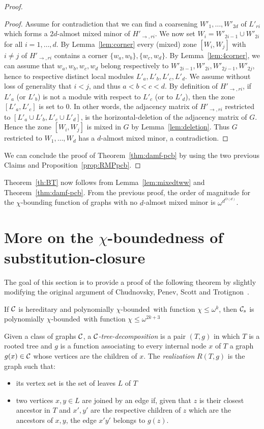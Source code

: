 \documentclass[11pt]{article}
\numberwithin{equation}{section}
\newcommand{\pcb}{polynomially $\chi$-bounded}
\begin{document}
\begin{proof}
\begin{proof}
    Assume for contradiction that we can find a coarsening $W'_1,\dots ,W'_{2d}$ of $L'_{ri}$ which forms a $2d$-almost mixed minor of $H'_{\rightarrow,ri}$. We now set $W_i=W'_{2i-1}\cup W'_{2i}$ for all $i=1,\dots ,d$. 
    By Lemma~\ref{lem:corner} every (mixed) zone $[W_i,W_j]$ with $i\neq j$ of $H'_{\rightarrow,ri}$ contains a corner $\{w_a,w_b\},\{w_c,w_d\}$.  By Lemma~\ref{lem:4corner}, we can assume that $w_a,w_b,w_c,w_d$ belong respectively to $W'_{2i-1},W'_{2i},W'_{2j-1},W'_{2j}$, hence to respective distinct local modules $L'_a,L'_b,L'_c,L'_d$.
    We assume without loss of generality that $i<j$, and thus $a<b<c<d$. 
    By definition of $H'_{\rightarrow,ri}$, if $L'_a$ (or $L'_b$) is not a module with respect to $L'_c$ (or to $L'_d$), then the zone $[L'_a,L'_c]$ is set to 0. In other words, the adjacency matrix of $H'_{\rightarrow,ri}$ restricted to $[L'_a\cup L'_b,L'_c\cup L'_d]$, is the horizontal-deletion of the adjacency matrix of $G$. Hence the zone $[W_i,W_j]$ is mixed in $G$ by Lemma~\ref{lem:deletion}. Thus $G$ restricted to $W_1,\dots ,W_d$ has a $d$-almost mixed minor, a contradiction.
\end{proof}
We can conclude the proof of Theorem~\ref{thm:damf-pcb} by using the two previous Claims and Proposition~\ref{prop:RMPpcb}.
\end{proof}

Theorem~\ref{th:BT} now follows from Lemma~\ref{lem:mixedtww} and Theorem~\ref{thm:damf-pcb}. From the previous proof, the order of magnitude for the $\chi$-bounding function of graphs with no $d$-almost mixed minor is $\omega^{d^{O(d)}}$.

\section{More on the $\chi$-boundedness of substitution-closure}\label{sec:subs}


The goal of this section is to provide a proof of the following theorem by slightly modifying the original argument of Chudnovsky, Penev, Scott and Trotignon~\cite{CPST13}.


\begin{theorem}\label{th:chibordec}
If $\cal C$ is hereditary and \pcb~with function $\chi \leq \omega^k$, then ${\cal C}_s$ is \pcb~with function $\chi \leq \omega^{2k+3}$
\end{theorem}

Given a class of graphs $\cal C$, a \emph{$\cal C$-tree-decomposition} is a pair $(T,g)$ in which $T$ is a rooted tree and $g$ is a function associating to every internal node $x$ of $T$ a graph $g(x)\in \cal C$ whose vertices are the children of $x$. The \emph{realization} $R(T,g)$ is the graph such that: 
\begin{itemize}
    \item its vertex set is the set of leaves $L$ of $T$
    \item two vertices $x,y\in L$ are joined by an edge if, given that $z$ is their closest ancestor in $T$ and $x',y'$ are the respective children of $z$ which are the ancestors of $x,y$, the edge $x'y'$ belongs to $g(z)$.
\end{itemize}
\end{document}
